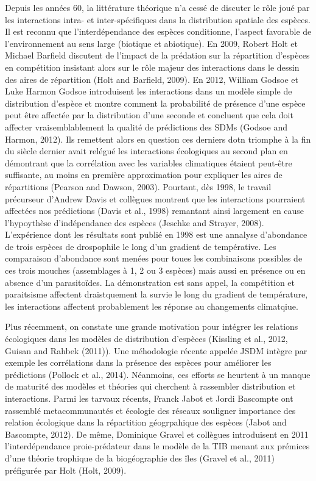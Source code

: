 Depuis les années 60, la littérature théorique n'a cessé de discuter le
rôle joué par les interactions intra- et inter-spécifiques dans la
distribution spatiale des espèces. Il est reconnu que l'interdépendance
des espèces conditionne, l'aspect favorable de l'environnement au sens
large (biotique et abiotique). En 2009, Robert Holt et Michael Barfield
discutent de l'impact de la prédation sur la répartition d'espèces en
compétition insistant alors sur le rôle majeur des interactions dans le
dessin des aires de répartition (Holt and Barfield, 2009). En 2012,
William Godsoe et Luke Harmon Godsoe introduisent les interactions dans
un modèle simple de distribution d'espèce et montre comment la
probabilité de présence d'une espèce peut être affectée par la
distribution d'une seconde et concluent que cela doit affecter
vraisemblablement la qualité de prédictions des SDMs (Godsoe and Harmon,
2012). Ils remettent alors en question ces derniers dotn triomphe à la
fin du siècle dernier avait relégué les interactions écologiques au
second plan en démontrant que la corrélation avec les variables
climatiques étaient peut-être suffisante, au moins en première
approximation pour expliquer les aires de répartitions (Pearson and
Dawson, 2003). Pourtant, dès 1998, le travail précurseur d'Andrew Davis
et collègues montrent que les interactions pourraient affectées nos
prédictions (Davis et al., 1998) remantant ainsi largement en cause
l'hypoythèse d'indépendance des espèces (Jeschke and Strayer, 2008).
L'expérience dont les résultats sont publié en 1998 est une annalyse
d'abondance de trois espèces de drospophile le long d'un gradient de
températive. Les comparaison d'abondance sont menées pour toues les
combinaisons possibles de ces trois mouches (assemblages à 1, 2 ou 3
espèces) mais aussi en présence ou en absence d'un parasitoïdes. La
démonstration est sans appel, la compétition et paraitsisme affectent
draistquement la survie le long du gradient de température, les
interactions affectent probablement les réponse au changements
climatqiue.

Plus récemment, on constate une grande motivation pour intégrer les
relations écologiques dans les modèles de distribution d'espèces
(Kissling et al., 2012, Guisan and Rahbek (2011)). Une méhodologie
récente appelée JSDM intègre par exemple les corrélations dans la
présence des espèces pour améliorer les prédictions (Pollock et al.,
2014). Néanmoins, ces efforts se heurtent à un manque de maturité des
modèles et théories qui cherchent à rassembler distribution et
interactions. Parmi les tarvaux récents, Franck Jabot et Jordi Bascompte
ont rassemblé metacommunautés et écologie des réseaux souligner
importance des relation écologique dans la répartition géogrpahique des
espèces (Jabot and Bascompte, 2012). De même, Dominique Gravel et
collègues introduisent en 2011 l'interdépendance proie-prédateur dans le
modèle de la TIB menant aux prémices d'une théorie trophique de la
biogéographie des îles (Gravel et al., 2011) préfigurée par Holt (Holt,
2009).

